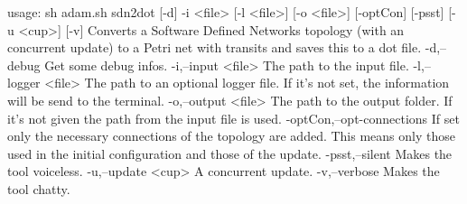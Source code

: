 usage: sh adam.sh sdn2dot [-d] -i <file> [-l <file>] [-o <file>] [-optCon]
       [-psst] [-u <cup>] [-v]
Converts a Software Defined Networks topology (with an concurrent update)
to a Petri net with transits and saves this to a dot file.
 -d,--debug                  Get some debug infos.
 -i,--input <file>           The path to the input file.
 -l,--logger <file>          The path to an optional logger file. If it's
                             not set, the information will be send to the
                             terminal.
 -o,--output <file>          The path to the output folder. If it's not
                             given the path from the input file is used.
 -optCon,--opt-connections   If set only the necessary connections of the
                             topology are added. This means only those
                             used in the initial configuration and those
                             of the update.
 -psst,--silent              Makes the tool voiceless.
 -u,--update <cup>           A concurrent update.
 -v,--verbose                Makes the tool chatty.
